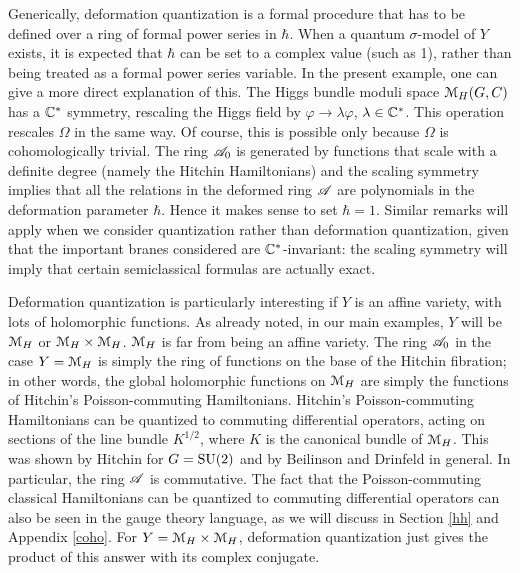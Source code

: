 \documentclass[11pt,a4paper]{article}
\begin{document}
Generically, deformation quantization is a formal procedure that has to be defined over a ring of formal power series in $\hbar$.   When a quantum $\sigma$-model
of $Y$ exists, it is expected that $\hbar$ can be set to a complex value (such as 1), rather than being treated as a formal power series variable.  
In the present example, one can give a more direct explanation of this.   The Higgs bundle moduli space ${\mathcal M}_H(G,C)$ has a ${\mathbb C}^*$ symmetry, rescaling
the Higgs field by $\varphi\to \lambda\varphi$, $\lambda\in {\mathbb C}^*$.     This operation rescales $\Omega$ in the same way.  Of course, this is possible only
because $\Omega$ is cohomologically trivial.  The ring ${\mathscr A}_0$ is generated by functions that scale with a definite degree 
(namely the Hitchin Hamiltonians) and the scaling symmetry implies
that all the relations in the deformed ring ${\mathscr A}$ are polynomials in the deformation parameter $\hbar$. Hence it makes sense to set $\hbar=1$.
Similar remarks will apply  when we consider quantization rather than deformation quantization, given that the important branes considered  are ${\mathbb C}^*$-invariant:
the scaling symmetry will imply that certain semiclassical formulas are actually exact. 


Deformation quantization is particularly interesting if $Y$ is an affine variety, with lots of holomorphic functions.  As already noted, in our main examples, 
 $Y$ will be  ${\mathcal M}_H$ or  ${\mathcal M}_H\times {\mathcal M}_H$.   ${\mathcal M}_H$ is far from being
an affine variety.  The ring ${\mathscr A}_0$ in the case $Y={\mathcal M}_H$ is simply the ring of functions on the base of the Hitchin fibration; in other words, the global holomorphic functions
on ${\mathcal M}_H$ are simply the functions of Hitchin's Poisson-commuting Hamiltonians.    Hitchin's Poisson-commuting Hamiltonians can be quantized
to commuting differential operators, acting on sections of the line bundle $K^{1/2}$, where $K$ is the canonical bundle of ${\mathcal M}_H$.
  This was shown by Hitchin \cite{H2}
for $G={\mathrm{SU}}(2)$ and by Beilinson and Drinfeld \cite{BD} in general.  In particular, the ring ${\mathscr A}$ is commutative.  
The fact that the Poisson-commuting classical Hamiltonians can be quantized to
commuting differential operators can also be seen in the gauge theory language, as we will discuss in Section \ref{hh} and Appendix \ref{coho}.  For $Y={\mathcal M}_H\times{\mathcal M}_H$,
deformation quantization just gives the product of this answer with its complex conjugate.
\end{document}
